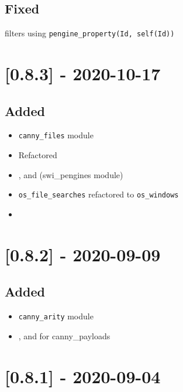 \subsection{Fixed}

\begin{shortlist}
    \item {} filters using \verb$pengine_property(Id, self(Id))$
\end{shortlist}

\section{[0.8.3] - 2020-10-17}

\subsection{Added}

\begin{itemize}
    \item \verb$canny_files$ module
    \item Refactored 
    \item {},  and  (swi_pengines module)
    \item \verb$os_file_searches$ refactored to \verb$os_windows$
    \item {}
\end{itemize}

\section{[0.8.2] - 2020-09-09}

\subsection{Added}

\begin{itemize}
    \item \verb$canny_arity$ module
    \item {},  and  for canny_payloads
\end{itemize}

\section{[0.8.1] - 2020-09-04}

